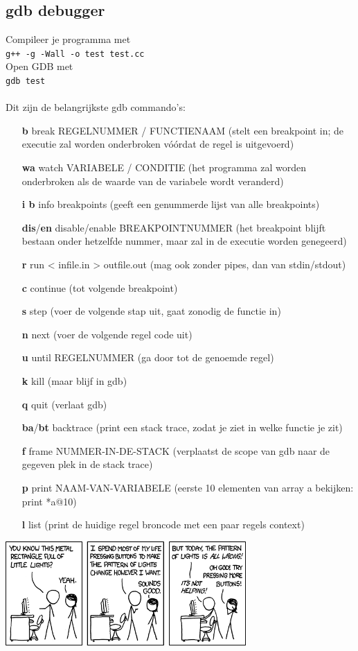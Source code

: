 \documentclass[10pt,a4paper,titlepage]{article}
\begin{document}
\subsection{gdb debugger}
Compileer je programma met\\ \texttt{g++ -g -Wall -o test test.cc}\\Open GDB met\\\texttt{gdb test}
~\\~\\
Dit zijn de belangrijkste gdb commando's:
\begin{itemize}[noitemsep,nolistsep]
\item[\textbf{b}]
break REGELNUMMER / FUNCTIENAAM (stelt een breakpoint in; de executie zal worden
                                 onderbroken vóórdat de regel is uitgevoerd)
\item[\textbf{wa}] watch VARIABELE / CONDITIE   (het programma zal worden onderbroken als de waarde
                              van de variabele wordt veranderd)
\item[\textbf{i b}] info breakpoints           (geeft een genummerde lijst van alle breakpoints)
\item[\textbf{dis}/\textbf{en}] disable/enable BREAKPOINTNUMMER  (het breakpoint blijft bestaan onder hetzelfde
                                 nummer, maar zal in de executie worden genegeerd)

\item[\textbf{r}] run < infile.in > outfile.out   (mag ook zonder pipes, dan van stdin/stdout)
\item[\textbf{c}] continue   (tot volgende breakpoint)
\item[\textbf{s}] step   (voer de volgende stap uit, gaat zonodig de functie in)
\item[\textbf{n}] next   (voer de volgende regel code uit)
\item[\textbf{u}] until REGELNUMMER   (ga door tot de genoemde regel)
\item[\textbf{k}] kill   (maar blijf in gdb)
\item[\textbf{q}] quit   (verlaat gdb)

\item[\textbf{ba}/\textbf{bt}] backtrace   (print een stack trace, zodat je ziet in welke functie je zit)
\item[\textbf{f}] frame NUMMER-IN-DE-STACK   (verplaatst de scope van gdb naar de gegeven plek in de stack trace)
\item[\textbf{p}] print NAAM-VAN-VARIABELE   (eerste 10 elementen van array a bekijken: print *a@10)
\item[\textbf{l}] list   (print de huidige regel broncode met een paar regels context)
\end{itemize}


\vfill
\begin{center}
\includegraphics[height=150px]{XKCD0722.png}
\end{center}
\end{document}
